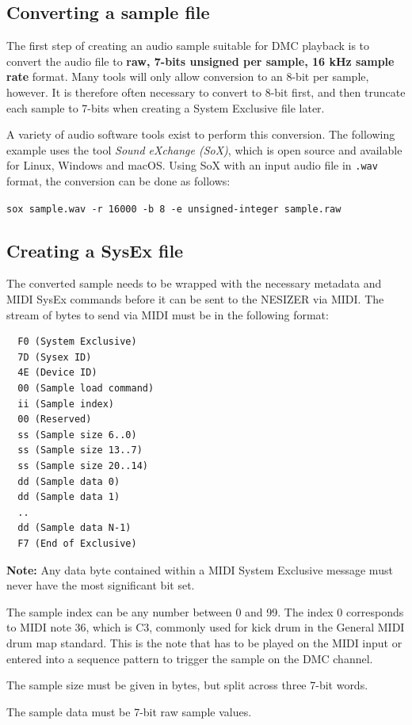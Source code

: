 \documentclass[a4paper, 12p]{extarticle}
\begin{document}
\subsection{Converting a sample file}
The first step of creating an audio sample suitable for DMC playback is to convert the audio file to \textbf{raw, 7-bits unsigned per sample, 16 kHz sample rate} format. Many tools will only allow conversion to an 8-bit per sample, however. It is therefore often necessary to convert to 8-bit first, and then truncate each sample to 7-bits when creating a System Exclusive file later.

A variety of audio software tools exist to perform this conversion. The following example uses the tool \emph{Sound eXchange (SoX)}, which is open source and available for Linux, Windows and macOS. Using SoX with an input audio file in \verb+.wav+ format, the conversion can be done as follows:

\verb+sox sample.wav -r 16000 -b 8 -e unsigned-integer sample.raw+

\subsection{Creating a SysEx file}
The converted sample needs to be wrapped with the necessary metadata and MIDI SysEx commands before it can be sent to the NESIZER via MIDI. The stream of bytes to send via MIDI must be in the following format:

\begin{verbatim}
  F0 (System Exclusive)
  7D (Sysex ID)
  4E (Device ID)
  00 (Sample load command)
  ii (Sample index)
  00 (Reserved)
  ss (Sample size 6..0)
  ss (Sample size 13..7)
  ss (Sample size 20..14)
  dd (Sample data 0)
  dd (Sample data 1)
  ..
  dd (Sample data N-1)
  F7 (End of Exclusive)
\end{verbatim}

\textbf{Note:} Any data byte contained within a MIDI System Exclusive message must never have the most significant bit set.

The sample index can be any number between 0 and 99. The index 0 corresponds to MIDI note 36, which is C3, commonly used for kick drum in the General MIDI drum map standard. This is the note that has to be played on the MIDI input or entered into a sequence pattern to trigger the sample on the DMC channel.

The sample size must be given in bytes, but split across three 7-bit words.

The sample data must be 7-bit raw sample values.
\end{document}
